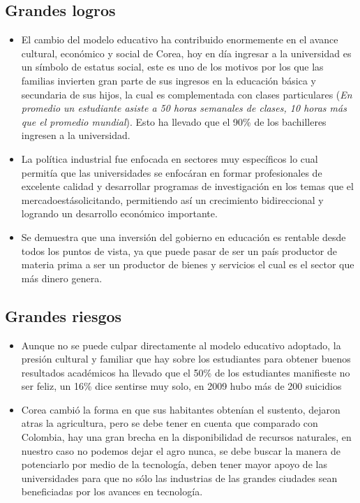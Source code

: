 \documentclass[conference]{IEEEtran}
\begin{document}
\subsection{Grandes logros}
\begin{itemize}
  \item El cambio del modelo educativo ha contribuido enormemente en el avance cultural, económico y social de Corea, hoy en día ingresar a la universidad es un símbolo de estatus social, este es uno de los motivos por los que las familias invierten gran parte de sus ingresos en la educación básica y secundaria de sus hijos, la cual es complementada con clases particulares (\emph{En promedio un estudiante asiste a 50 horas semanales de clases, 10 horas más que el promedio mundial}). Esto ha llevado que el 90\% de los bachilleres ingresen a la universidad.
  \item La política industrial fue enfocada en sectores muy específicos lo cual permitía que las universidades se enfocáran en formar profesionales de excelente calidad y desarrollar programas de investigación en los temas que el mercadoestásolicitando, permitiendo así un crecimiento bidireccional y logrando un desarrollo económico importante.
  \item Se demuestra que una inversión del gobierno en educación es rentable desde todos los puntos de vista, ya que puede pasar de ser un país productor de materia prima a ser un productor de bienes y servicios el cual es el sector que más dinero genera.
\end{itemize}


\subsection{Grandes riesgos}
\begin{itemize}
\item Aunque no se puede culpar directamente al modelo educativo adoptado, la presión cultural y familiar que hay sobre los estudiantes para obtener buenos resultados académicos ha llevado que el 50\% de los estudiantes manifieste no ser feliz, un 16\% dice sentirse muy solo, en 2009 hubo más de 200 suicidios\cite{infelices}
\item Corea cambió la forma en que sus habitantes obtenían el sustento, dejaron atras la agricultura, pero se debe tener en cuenta que comparado con Colombia, hay una gran brecha en la disponibilidad de recursos naturales, en nuestro caso no podemos dejar el agro nunca, se debe buscar la manera de potenciarlo por medio de la tecnología, deben tener mayor apoyo de las universidades para que no sólo las industrias de las grandes ciudades sean beneficiadas por los avances en tecnología. 
\end{itemize}
\end{document}
